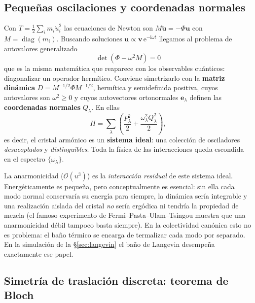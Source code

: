 \documentclass[11pt,a4paper]{article}
\newcommand{\ii}{\mathrm{i}}
\newcommand{\ee}{\mathrm{e}}
\begin{document}
\subsection{Pequeñas oscilaciones y coordenadas normales}\label{sec:normales}

Con $T=\tfrac12\sum_i m_i\dot u_i^2$ las ecuaciones de Newton son
$M\ddot{\bm u}=-\Phi\bm u$ con $M=\operatorname{diag}(m_i)$. Buscando
soluciones $\bm u\propto\bm v\,\ee^{-\ii\omega t}$ llegamos al problema de
autovalores generalizado
\begin{equation}
\boxed{\det\!\left(\Phi-\omega^2 M\right)=0}
\label{eq:secular}
\end{equation}
que es la misma matemática que reaparece con los observables cuánticos:
diagonalizar un operador hermítico. Conviene simetrizarlo con la
\textbf{matriz dinámica} $D=M^{-1/2}\Phi M^{-1/2}$, hermítica y semidefinida
positiva, cuyos autovalores son $\omega^2\geq 0$ y cuyos autovectores
ortonormales $\bm e_\lambda$ definen las \textbf{coordenadas normales}
$Q_\lambda$. En ellas
\begin{equation}
H=\sum_\lambda\left(\frac{P_\lambda^2}{2}+\frac{\omega_\lambda^2Q_\lambda^2}{2}\right),
\end{equation}
es decir, el cristal armónico es un \textbf{sistema ideal}: una colección de
osciladores \emph{desacoplados} y \emph{distinguibles}. Toda la física de las
interacciones queda escondida en el espectro $\{\omega_\lambda\}$.

\begin{idea}
La anarmonicidad ($\mathcal O(u^3)$) es la \emph{interacción residual} de este
sistema ideal. Energéticamente es pequeña, pero conceptualmente es esencial:
sin ella cada modo normal conservaría su energía para siempre, la dinámica sería
integrable y una realización aislada del cristal \emph{no} sería ergódica ni
tendría la propiedad de mezcla (el famoso experimento de
Fermi–Pasta–Ulam–Tsingou muestra que una anarmonicidad débil tampoco basta
siempre). En la colectividad canónica esto no es problema: el baño térmico se
encarga de termalizar cada modo por separado. En la simulación de la
\S\ref{sec:langevin} el baño de Langevin desempeña exactamente ese papel.
\end{idea}

\subsection{Simetría de traslación discreta: teorema de Bloch}
\end{document}
